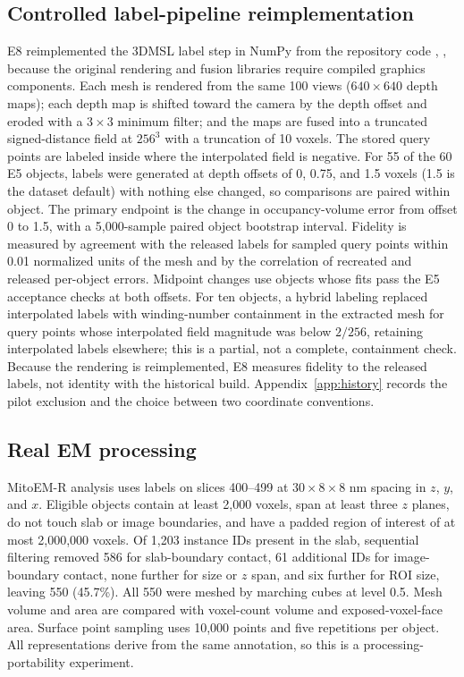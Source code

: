 \documentclass[journal]{IEEEtran}
\begin{document}
\subsection{Controlled label-pipeline reimplementation}\label{sec:e8methods}

E8 reimplemented the 3DMSL label step in NumPy from the repository code \cite{ref20}, \cite{ref22}, because the original rendering and fusion libraries require compiled graphics components. Each mesh is rendered from the same 100 views ($640\times640$ depth maps); each depth map is shifted toward the camera by the depth offset and eroded with a $3\times3$ minimum filter; and the maps are fused into a truncated signed-distance field at $256^3$ with a truncation of 10 voxels. The stored query points are labeled inside where the interpolated field is negative. For 55 of the 60 E5 objects, labels were generated at depth offsets of 0, 0.75, and 1.5 voxels (1.5 is the dataset default) with nothing else changed, so comparisons are paired within object. The primary endpoint is the change in occupancy-volume error from offset 0 to 1.5, with a 5,000-sample paired object bootstrap interval. Fidelity is measured by agreement with the released labels for sampled query points within 0.01 normalized units of the mesh and by the correlation of recreated and released per-object errors. Midpoint changes use objects whose fits pass the E5 acceptance checks at both offsets. For ten objects, a hybrid labeling replaced interpolated labels with winding-number containment in the extracted mesh for query points whose interpolated field magnitude was below $2/256$, retaining interpolated labels elsewhere; this is a partial, not a complete, containment check. Because the rendering is reimplemented, E8 measures fidelity to the released labels, not identity with the historical build. Appendix~\ref{app:history} records the pilot exclusion and the choice between two coordinate conventions.

\subsection{Real EM processing}

MitoEM-R analysis uses labels on slices 400--499 at $30\times8\times8$ nm spacing in $z$, $y$, and $x$. Eligible objects contain at least 2,000 voxels, span at least three $z$ planes, do not touch slab or image boundaries, and have a padded region of interest of at most 2,000,000 voxels. Of 1,203 instance IDs present in the slab, sequential filtering removed 586 for slab-boundary contact, 61 additional IDs for image-boundary contact, none further for size or $z$ span, and six further for ROI size, leaving 550 (45.7\%).
All 550 were meshed by marching cubes \cite{ref23} at level 0.5. Mesh volume and area are compared with voxel-count volume and exposed-voxel-face area. Surface point sampling uses 10,000 points and five repetitions per object. All representations derive from the same annotation, so this is a processing-portability experiment.
\end{document}
